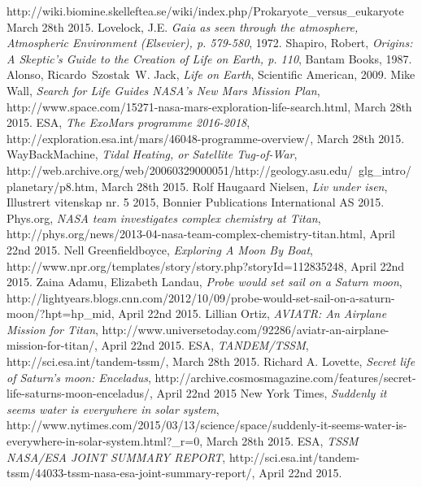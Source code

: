 \begin{thebibliography}{99}
		http://wiki.biomine.skelleftea.se/wiki/index.php/Prokaryote\_versus\_eukaryote
		March 28th 2015.
		 Lovelock, J.E.
		\emph{Gaia as seen through the atmosphere, Atmospheric Environment (Elsevier), p. 579-580},
		1972.
		Shapiro, Robert,
		\emph{Origins: A Skeptic's Guide to the Creation of Life on Earth, p. 110},
		Bantam Books,
		1987.
		Alonso, Ricardo\, Szostak\, W. Jack,
		\emph{Life on Earth},
		Scientific American,
		2009.
		Mike Wall,
		\emph{Search for Life Guides NASA's New Mars Mission Plan},
		http://www.space.com/15271-nasa-mars-exploration-life-search.html,
		March 28th 2015.
		ESA,
		\emph{The ExoMars programme 2016-2018},
		http://exploration.esa.int/mars/46048-programme-overview/,
		March 28th 2015.
		WayBackMachine,
		\emph{Tidal Heating, or Satellite Tug-of-War},
		http://web.archive.org/web/20060329000051/http://geology.asu.edu/~glg\_intro/planetary/p8.htm,
		March 28th 2015.
		Rolf Haugaard Nielsen,
		\emph{Liv under isen},
		Illustrert vitenskap nr. 5 2015,
		Bonnier Publications International AS
		2015.
		Phys.org,
		\emph{NASA team investigates complex chemistry at Titan},
		http://phys.org/news/2013-04-nasa-team-complex-chemistry-titan.html,
		April 22nd 2015.
		Nell Greenfieldboyce,
		\emph{Exploring A Moon By Boat},
		http://www.npr.org/templates/story/story.php?storyId=112835248,
		April 22nd 2015.
		Zaina Adamu, Elizabeth Landau,
		\emph{Probe would set sail on a Saturn moon},
		http://lightyears.blogs.cnn.com/2012/10/09/probe-would-set-sail-on-a-saturn-moon/?hpt=hp\_mid,
		April 22nd 2015.
		Lillian Ortiz,
		\emph{AVIATR: An Airplane Mission for Titan},
		http://www.universetoday.com/92286/aviatr-an-airplane-mission-for-titan/,
		April 22nd 2015.
		ESA,
		\emph{TANDEM/TSSM},
		http://sci.esa.int/tandem-tssm/,
		March 28th 2015.
		Richard A. Lovette,
		\emph{Secret life of Saturn’s moon: Enceladus},
		http://archive.cosmosmagazine.com/features/secret-life-saturns-moon-enceladus/,
		April 22nd 2015
		New York Times,
		\emph{Suddenly it seems water is everywhere in solar system},
		http://www.nytimes.com/2015/03/13/science/space/suddenly-it-seems-water-is-everywhere-in-solar-system.html?\_r=0,
		March 28th 2015.
		ESA,
		\emph{TSSM NASA/ESA JOINT SUMMARY REPORT},
		http://sci.esa.int/tandem-tssm/44033-tssm-nasa-esa-joint-summary-report/,
		April 22nd 2015.

\end{thebibliography}
